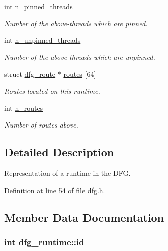\begin{DoxyCompactItemize}
int \hyperlink{structdfg__runtime_acb3779eccb9614f48771aeb3e16394bc}{n\-\_\-pinned\-\_\-threads}
\begin{DoxyCompactList}\small\item\em Number of the above-\/threads which are pinned. \end{DoxyCompactList}\item 
int \hyperlink{structdfg__runtime_ae9fb600da8228ad88cc06dfd863d980f}{n\-\_\-unpinned\-\_\-threads}
\begin{DoxyCompactList}\small\item\em Number of the above-\/threads which are unpinned. \end{DoxyCompactList}\item 
struct \hyperlink{structdfg__route}{dfg\-\_\-route} $\ast$ \hyperlink{structdfg__runtime_a1ad88caaa574b644201c1abccd94066a}{routes} \mbox{[}64\mbox{]}
\begin{DoxyCompactList}\small\item\em Routes located on this runtime. \end{DoxyCompactList}\item 
int \hyperlink{structdfg__runtime_a410c8ded04d9b53061dbb939446ac26a}{n\-\_\-routes}
\begin{DoxyCompactList}\small\item\em Number of routes above. \end{DoxyCompactList}\end{DoxyCompactItemize}


\subsection{Detailed Description}
Representation of a runtime in the D\-F\-G. 

Definition at line 54 of file dfg.\-h.



\subsection{Member Data Documentation}
\hypertarget{structdfg__runtime_ab9978989f372b69d34ef5e186a5db881}{
\subsubsection[{id}]{\setlength{\rightskip}{0pt plus 5cm}int dfg\-\_\-runtime\-::id}}\label{structdfg__runtime_ab9978989f372b69d34ef5e186a5db881}


